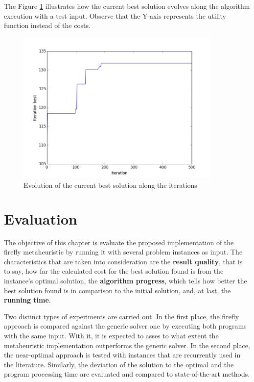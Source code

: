\documentclass[tuberlin,cic,tc,openright,english,noabntcite,oneside]{iiufrgs}
\begin{document}
The Figure \ref{fig:best-solution-evolution} illustrates how the current best solution evolves along the algorithm  execution with a test input. Observe that the Y-axis represents the utility function instead of the costs.
\begin{figure}[H]
	\centering
    \caption{Evolution of the current best solution along the iterations}
    \includegraphics[width=0.9\textwidth]{fig_best_sol_evolution}\par
    \label{fig:best-solution-evolution}
\end{figure}

\chapter{Evaluation}\label{sec:evaluation}
The objective of this chapter is evaluate the proposed implementation of the firefly metaheuristic by running it with several problem instances as input. The characteristics that are taken into consideration are the \textbf{result quality}, that is to say, how far the calculated cost for the best solution found is from the instance's optimal solution, the \textbf{algorithm progress}, which tells how better the best solution found is in comparison to the initial solution, and, at last, the \textbf{running time}.

Two distinct types of experiments are carried out. In the first place, the firefly approach is compared against the generic solver one by executing both programs with the same input. With it, it is expected to asses to what extent the metaheuristic implementation outperforms the generic solver. In the second place, the near-optimal approach is tested with instances that are recurrently used in the literature. Similarly, the deviation of the solution to the optimal and the program processing time are evaluated and compared to state-of-the-art methods.
\end{document}
